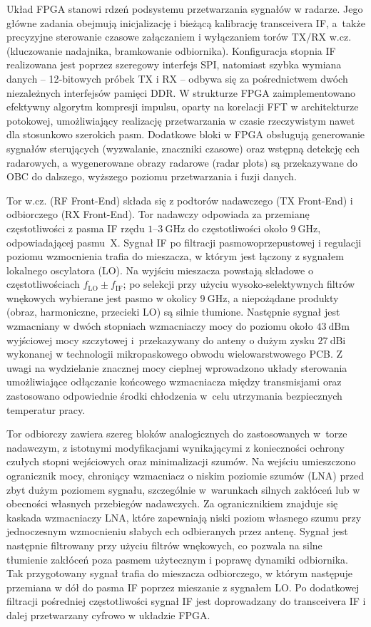Układ FPGA stanowi rdzeń podsystemu przetwarzania sygnałów w radarze. 
Jego główne zadania obejmują inicjalizację i bieżącą kalibrację transceivera IF, a~także precyzyjne sterowanie czasowe załączaniem i wyłączaniem torów TX/RX w.cz. (kluczowanie nadajnika, bramkowanie odbiornika). 
Konfiguracja stopnia IF realizowana jest poprzez szeregowy interfejs SPI, natomiast szybka wymiana danych -- 12‑bitowych próbek TX i RX -- odbywa się za pośrednictwem dwóch niezależnych interfejsów pamięci DDR. 
W strukturze FPGA zaimplementowano efektywny algorytm kompresji impulsu, oparty na korelacji FFT w architekturze potokowej, umożliwiający realizację przetwarzania w czasie rzeczywistym nawet dla stosunkowo szerokich pasm. 
Dodatkowe bloki w FPGA obsługują generowanie sygnałów sterujących (wyzwalanie, znaczniki czasowe) oraz wstępną detekcję ech radarowych, a wygenerowane obrazy radarowe (radar plots) są przekazywane do OBC do dalszego, wyższego poziomu przetwarzania i fuzji danych.

Tor w.cz. (RF Front-End) składa się z podtorów nadawczego (TX Front-End) i odbiorczego (RX Front-End). 
Tor nadawczy odpowiada za przemianę częstotliwości z pasma IF rzędu \(1\text{--}3~\mathrm{GHz}\) do częstotliwości około \(9~\mathrm{GHz}\), odpowiadającej pasmu~X. 
Sygnał IF po filtracji pasmowoprzepustowej i regulacji poziomu wzmocnienia trafia do mieszacza, w którym jest łączony z sygnałem lokalnego oscylatora (LO). 
Na wyjściu mieszacza powstają składowe o częstotliwościach \(f_{\mathrm{LO}}\pm f_{\mathrm{IF}}\); po selekcji przy użyciu wysoko‑selektywnych filtrów wnękowych wybierane jest pasmo w okolicy \(9~\mathrm{GHz}\), a niepożądane produkty (obraz, harmoniczne, przecieki LO) są silnie tłumione. 
Następnie sygnał jest wzmacniany w dwóch stopniach wzmacniaczy mocy do poziomu około \(43~\mathrm{dBm}\) wyjściowej mocy szczytowej i~przekazywany do anteny o dużym zysku \(27~\mathrm{dBi}\) wykonanej w technologii mikropaskowego obwodu wielowarstwowego PCB.
Z uwagi na wydzielanie znacznej mocy cieplnej wprowadzono układy sterowania umożliwiające odłączanie końcowego wzmacniacza między transmisjami oraz zastosowano odpowiednie środki chłodzenia w~celu utrzymania bezpiecznych temperatur pracy.

Tor odbiorczy zawiera szereg bloków analogicznych do zastosowanych w~torze nadawczym, z istotnymi modyfikacjami wynikającymi z konieczności ochrony czułych stopni wejściowych oraz minimalizacji szumów. 
Na wejściu umieszczono ogranicznik mocy, chroniący wzmacniacz o niskim poziomie szumów (LNA) przed zbyt dużym poziomem sygnału, szczególnie w~warunkach silnych zakłóceń lub w obecności własnych przebiegów nadawczych. 
Za ogranicznikiem znajduje się kaskada wzmacniaczy LNA, które zapewniają niski poziom własnego szumu przy jednoczesnym wzmocnieniu słabych ech odbieranych przez antenę. 
Sygnał jest następnie filtrowany przy użyciu filtrów wnękowych, co pozwala na silne tłumienie zakłóceń poza pasmem użytecznym i poprawę dynamiki odbiornika. 
Tak przygotowany sygnał trafia do mieszacza odbiorczego, w którym następuje przemiana w dół do pasma IF poprzez mieszanie z sygnałem LO. 
Po dodatkowej filtracji pośredniej częstotliwości sygnał IF jest doprowadzany do transceivera IF i dalej przetwarzany cyfrowo w układzie FPGA.

